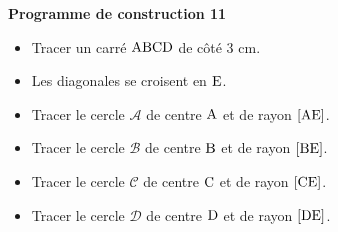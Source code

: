 \documentclass[exercice,a4]{thedocument}%
\begin{document}
%
\noindent\textbf{Programme de construction 11}\par\smallskip\noindent
\begin{itemize}
    \item Tracer un carré $\text{ABCD}$ de côté $3\text{ cm}$.
    \item Les diagonales se croisent en $\text{E}$.
    \item Tracer le cercle $\mathcal{A}$ de centre $\text{A}$ et de
    rayon $[\text{AE}]$.
    \item Tracer le cercle $\mathcal{B}$ de centre $\text{B}$ et de
    rayon $[\text{BE}]$.
    \item Tracer le cercle $\mathcal{C}$ de centre $\text{C}$ et de
    rayon $[\text{CE}]$.
    \item Tracer le cercle $\mathcal{D}$ de centre $\text{D}$ et de
    rayon $[\text{DE}]$.
\end{itemize}
\end{document}
